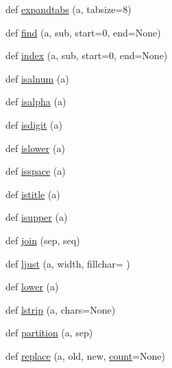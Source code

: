 \begin{DoxyCompactItemize}
\item 
def \hyperlink{namespacenumpy_1_1core_1_1defchararray_aa7634cd9c3f4d7ba47d4fcbff8fa0f1d}{expandtabs} (a, tabsize=8)
\item 
def \hyperlink{namespacenumpy_1_1core_1_1defchararray_afbf7ccc1eace251be1ee26ee1deb0e14}{find} (a, sub, start=0, end=None)
\item 
def \hyperlink{namespacenumpy_1_1core_1_1defchararray_a2472210b68b9a54ef106cf588af14748}{index} (a, sub, start=0, end=None)
\item 
def \hyperlink{namespacenumpy_1_1core_1_1defchararray_a84e96a6787251358996f8635bdcd1664}{isalnum} (a)
\item 
def \hyperlink{namespacenumpy_1_1core_1_1defchararray_a8b11c782e2ae766787863211cd831dba}{isalpha} (a)
\item 
def \hyperlink{namespacenumpy_1_1core_1_1defchararray_ac64ff22a93452d51136aa417638691b6}{isdigit} (a)
\item 
def \hyperlink{namespacenumpy_1_1core_1_1defchararray_a8674bd9ad266f9bfff4226e6c1634807}{islower} (a)
\item 
def \hyperlink{namespacenumpy_1_1core_1_1defchararray_a50319bf103ed2a8de426340f90b6ee88}{isspace} (a)
\item 
def \hyperlink{namespacenumpy_1_1core_1_1defchararray_aa22aba114aad6627f77db9043334d4b4}{istitle} (a)
\item 
def \hyperlink{namespacenumpy_1_1core_1_1defchararray_a631a6113cb84184964d4b1b7ca2acfbd}{isupper} (a)
\item 
def \hyperlink{namespacenumpy_1_1core_1_1defchararray_a06e32ed9d4e21fa96a6899d57b157954}{join} (sep, seq)
\item 
def \hyperlink{namespacenumpy_1_1core_1_1defchararray_a98145cf2cf6ec1292f52162139b69db8}{ljust} (a, width, fillchar=\textquotesingle{} \textquotesingle{})
\item 
def \hyperlink{namespacenumpy_1_1core_1_1defchararray_a00f236ce1422db553905a918a30625c6}{lower} (a)
\item 
def \hyperlink{namespacenumpy_1_1core_1_1defchararray_a27c898d70e469f70c98adce97cb5c655}{lstrip} (a, chars=None)
\item 
def \hyperlink{namespacenumpy_1_1core_1_1defchararray_a44b124c89363204fc7c204026a190c89}{partition} (a, sep)
\item 
def \hyperlink{namespacenumpy_1_1core_1_1defchararray_a89de39e6aad0349370400196b3f8d143}{replace} (a, old, new, \hyperlink{namespacenumpy_1_1core_1_1defchararray_ad55baa07b66bc2b0f442f744091c4985}{count}=None)

\end{DoxyCompactItemize}
